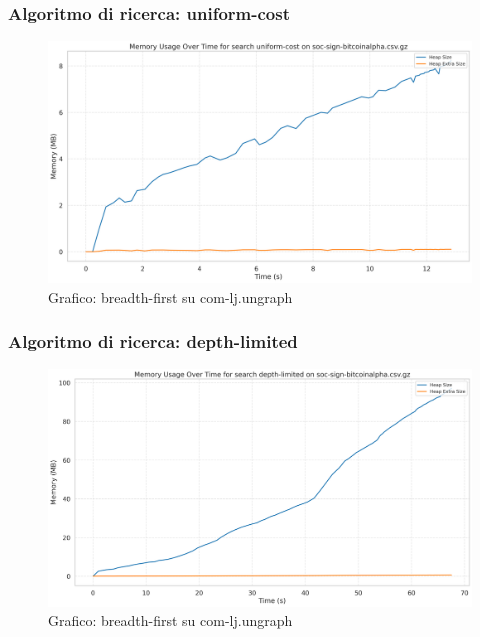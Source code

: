 \documentclass{article}
\begin{document}
\subsubsection{Algoritmo di ricerca: uniform-cost}
\begin{figure}[h]\centering
	\includegraphics[width=\textwidth]{../plots/soc-sign-bitcoinalpha.csv_uniform-cost.png}
	\caption{Grafico: breadth-first su com-lj.ungraph}
\end{figure}
\subsubsection{Algoritmo di ricerca: depth-limited}
\begin{figure}[h]\centering
	\includegraphics[width=\textwidth]{../plots/soc-sign-bitcoinalpha.csv_depth-limited.png}
	\caption{Grafico: breadth-first su com-lj.ungraph}
\end{figure}
\end{document}
